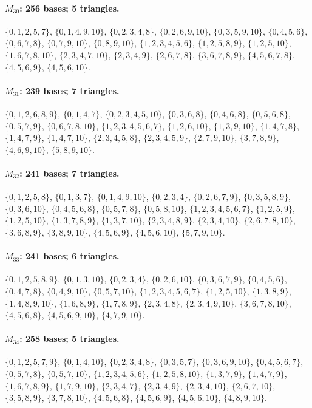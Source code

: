 \paragraph{$M_{30}$: 256 bases; 5 triangles.}
\(\{0,1,2,5,7\}\), \(\{0,1,4,9,10\}\), \(\{0,2,3,4,8\}\), \(\{0,2,6,9,10\}\), \(\{0,3,5,9,10\}\), \(\{0,4,5,6\}\), \(\{0,6,7,8\}\), \(\{0,7,9,10\}\), \(\{0,8,9,10\}\), \(\{1,2,3,4,5,6\}\), \(\{1,2,5,8,9\}\), \(\{1,2,5,10\}\), \(\{1,6,7,8,10\}\), \(\{2,3,4,7,10\}\), \(\{2,3,4,9\}\), \(\{2,6,7,8\}\), \(\{3,6,7,8,9\}\), \(\{4,5,6,7,8\}\), \(\{4,5,6,9\}\), \(\{4,5,6,10\}\).

\paragraph{$M_{31}$: 239 bases; 7 triangles.}
\(\{0,1,2,6,8,9\}\), \(\{0,1,4,7\}\), \(\{0,2,3,4,5,10\}\), \(\{0,3,6,8\}\), \(\{0,4,6,8\}\), \(\{0,5,6,8\}\), \(\{0,5,7,9\}\), \(\{0,6,7,8,10\}\), \(\{1,2,3,4,5,6,7\}\), \(\{1,2,6,10\}\), \(\{1,3,9,10\}\), \(\{1,4,7,8\}\), \(\{1,4,7,9\}\), \(\{1,4,7,10\}\), \(\{2,3,4,5,8\}\), \(\{2,3,4,5,9\}\), \(\{2,7,9,10\}\), \(\{3,7,8,9\}\), \(\{4,6,9,10\}\), \(\{5,8,9,10\}\).

\paragraph{$M_{32}$: 241 bases; 7 triangles.}
\(\{0,1,2,5,8\}\), \(\{0,1,3,7\}\), \(\{0,1,4,9,10\}\), \(\{0,2,3,4\}\), \(\{0,2,6,7,9\}\), \(\{0,3,5,8,9\}\), \(\{0,3,6,10\}\), \(\{0,4,5,6,8\}\), \(\{0,5,7,8\}\), \(\{0,5,8,10\}\), \(\{1,2,3,4,5,6,7\}\), \(\{1,2,5,9\}\), \(\{1,2,5,10\}\), \(\{1,3,7,8,9\}\), \(\{1,3,7,10\}\), \(\{2,3,4,8,9\}\), \(\{2,3,4,10\}\), \(\{2,6,7,8,10\}\), \(\{3,6,8,9\}\), \(\{3,8,9,10\}\), \(\{4,5,6,9\}\), \(\{4,5,6,10\}\), \(\{5,7,9,10\}\).

\paragraph{$M_{33}$: 241 bases; 6 triangles.}
\(\{0,1,2,5,8,9\}\), \(\{0,1,3,10\}\), \(\{0,2,3,4\}\), \(\{0,2,6,10\}\), \(\{0,3,6,7,9\}\), \(\{0,4,5,6\}\), \(\{0,4,7,8\}\), \(\{0,4,9,10\}\), \(\{0,5,7,10\}\), \(\{1,2,3,4,5,6,7\}\), \(\{1,2,5,10\}\), \(\{1,3,8,9\}\), \(\{1,4,8,9,10\}\), \(\{1,6,8,9\}\), \(\{1,7,8,9\}\), \(\{2,3,4,8\}\), \(\{2,3,4,9,10\}\), \(\{3,6,7,8,10\}\), \(\{4,5,6,8\}\), \(\{4,5,6,9,10\}\), \(\{4,7,9,10\}\).

\paragraph{$M_{34}$: 258 bases; 5 triangles.}
\(\{0,1,2,5,7,9\}\), \(\{0,1,4,10\}\), \(\{0,2,3,4,8\}\), \(\{0,3,5,7\}\), \(\{0,3,6,9,10\}\), \(\{0,4,5,6,7\}\), \(\{0,5,7,8\}\), \(\{0,5,7,10\}\), \(\{1,2,3,4,5,6\}\), \(\{1,2,5,8,10\}\), \(\{1,3,7,9\}\), \(\{1,4,7,9\}\), \(\{1,6,7,8,9\}\), \(\{1,7,9,10\}\), \(\{2,3,4,7\}\), \(\{2,3,4,9\}\), \(\{2,3,4,10\}\), \(\{2,6,7,10\}\), \(\{3,5,8,9\}\), \(\{3,7,8,10\}\), \(\{4,5,6,8\}\), \(\{4,5,6,9\}\), \(\{4,5,6,10\}\), \(\{4,8,9,10\}\).

